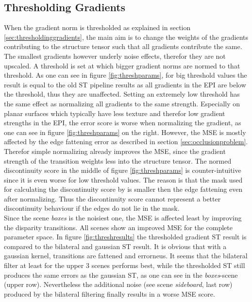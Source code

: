 \documentclass  [
  paper    = a4,
  BCOR     = 10mm,
  twoside,
  fontsize = 12pt,
  fleqn,
  toc      = bibnumbered,
  toc      = listofnumbered,
  numbers  = noendperiod,
  headings = normal,
  listof   = leveldown,
  version  = 3.03
]                                       {scrreprt}
\begin{document}
\subsection{Thresholding Gradients}
When the gradient norm is thresholded as explained in section \ref{sec:thresholdinggradients}, the main aim is to change the weights of the gradients contributing to the structure tensor such that all gradients contribute the same. The smallest gradients however underly noise effects, therefor they are not upscaled. A threshold is set at which bigger gradient norms are normed to that threshold. As one can see in figure \ref{fig:threshparams}, for big threshold values the result is equal to the old ST pipeline results as all gradients in the EPI are below the threshold, thus they are unaffected. Setting an extremely low threshold has the same effect as normalizing all gradients to the same strength. Especially on planar surfaces which typically have less texture and therefor low gradient strengths in the EPI, the error score is worse when normalizing the gradient, as one can see in figure \ref{fig:threshparams} on the right. However, the MSE is mostly affected by the edge fattening error as described in section \ref{sec:occlusionproblem}. Therefor simple normalizing already improves the MSE, since the gradient strength of the transition weights less into the structure tensor. The normed discontinuity score in the middle of figure \ref{fig:threshparams} is counter-intuitive since it is even worse for low threshold values. The reason is that the mask used for calculating the discontinuity score by \cite{honauer2016benchmark} is smaller then the edge fattening even after normalizing. Thus the discontinuity score cannot represent a better discontinuity behaviour if the edges do not lie in the mask. \\
Since the scene \textit{boxes} is the noisiest one, the MSE is affected least by improving the disparity transitions. All scenes show an improved MSE for the complete parameter space. In figure \ref{fig:threshresults} the thresholded gradient ST result is compared to the bilateral and gaussian ST result. It is obvious that with a gaussian kernel, transitions are fattened and errorneus. It seems that the bilateral filter at least for the upper 3 scenes performs best, while the thresholded ST still produces the same errors as the gaussian ST, as one can see in the \textit{boxes}-scene (upper row). Nevertheless the additional noise (see scene \textit{sideboard}, last row) produced by the bilateral filtering finally results in a worse MSE score. 
\end{document}
